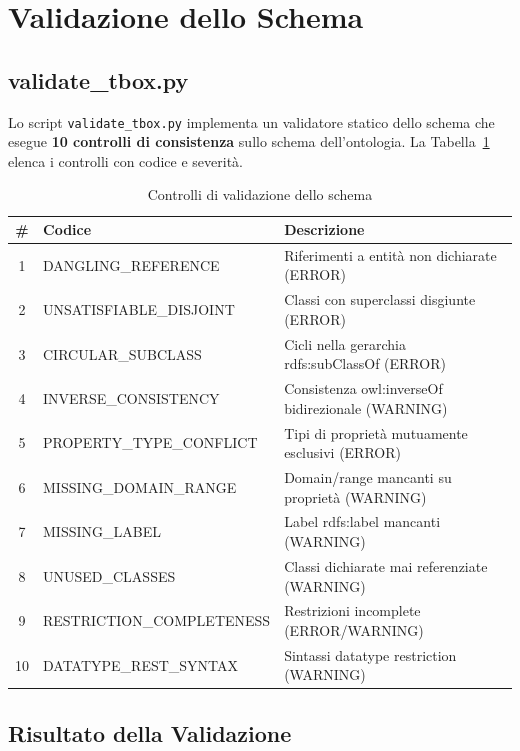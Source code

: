 \section{Validazione dello Schema}
\label{sec:validazione}

\subsection{validate\_tbox.py}

Lo script \texttt{validate\_tbox.py} implementa un validatore statico dello schema
che esegue \textbf{10 controlli di consistenza} sullo schema dell'ontologia.
La Tabella~\ref{tab:checks} elenca i controlli con codice e severit\`a.

\begin{table}[h]
\centering
\caption{Controlli di validazione dello schema}
\label{tab:checks}
\begin{tabular}{cll}
\toprule
\textbf{\#} & \textbf{Codice}                 & \textbf{Descrizione} \\
\midrule
1 & DANGLING\_REFERENCE        & Riferimenti a entit\`a non dichiarate (ERROR) \\
2 & UNSATISFIABLE\_DISJOINT    & Classi con superclassi disgiunte (ERROR) \\
3 & CIRCULAR\_SUBCLASS         & Cicli nella gerarchia rdfs:subClassOf (ERROR) \\
4 & INVERSE\_CONSISTENCY       & Consistenza owl:inverseOf bidirezionale (WARNING) \\
5 & PROPERTY\_TYPE\_CONFLICT    & Tipi di propriet\`a mutuamente esclusivi (ERROR) \\
6 & MISSING\_DOMAIN\_RANGE      & Domain/range mancanti su propriet\`a (WARNING) \\
7 & MISSING\_LABEL             & Label rdfs:label mancanti (WARNING) \\
8 & UNUSED\_CLASSES            & Classi dichiarate mai referenziate (WARNING) \\
9 & RESTRICTION\_COMPLETENESS  & Restrizioni incomplete (ERROR/WARNING) \\
10& DATATYPE\_REST\_SYNTAX      & Sintassi datatype restriction (WARNING) \\
\bottomrule
\end{tabular}
\end{table}

\subsection{Risultato della Validazione}

